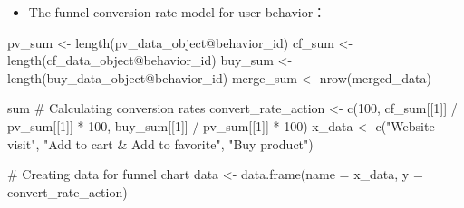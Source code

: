 \documentclass[
  11pt,
]{article}
\newenvironment{Shaded}{\begin{snugshade}}{\end{snugshade}}
\newcommand{\AttributeTok}[1]{\textcolor[rgb]{0.40,0.45,0.13}{#1}}
\newcommand{\CommentTok}[1]{\textcolor[rgb]{0.37,0.37,0.37}{#1}}
\newcommand{\DecValTok}[1]{\textcolor[rgb]{0.68,0.00,0.00}{#1}}
\newcommand{\FunctionTok}[1]{\textcolor[rgb]{0.28,0.35,0.67}{#1}}
\newcommand{\NormalTok}[1]{\textcolor[rgb]{0.00,0.23,0.31}{#1}}
\newcommand{\OtherTok}[1]{\textcolor[rgb]{0.00,0.23,0.31}{#1}}
\newcommand{\SpecialCharTok}[1]{\textcolor[rgb]{0.37,0.37,0.37}{#1}}
\newcommand{\StringTok}[1]{\textcolor[rgb]{0.13,0.47,0.30}{#1}}
\providecommand{\tightlist}{%
  \setlength{\itemsep}{0pt}\setlength{\parskip}{0pt}}\usepackage{longtable,booktabs,array}
\begin{document}
\begin{itemize}
\tightlist
\item
  The funnel conversion rate model for user behavior：
\end{itemize}

\begin{Shaded}
\begin{Highlighting}[]
\NormalTok{pv\_sum  }\OtherTok{\textless{}{-}} \FunctionTok{length}\NormalTok{(pv\_data\_object}\SpecialCharTok{@}\NormalTok{behavior\_id)}
\NormalTok{cf\_sum  }\OtherTok{\textless{}{-}} \FunctionTok{length}\NormalTok{(cf\_data\_object}\SpecialCharTok{@}\NormalTok{behavior\_id)}
\NormalTok{buy\_sum  }\OtherTok{\textless{}{-}} \FunctionTok{length}\NormalTok{(buy\_data\_object}\SpecialCharTok{@}\NormalTok{behavior\_id)}
\NormalTok{merge\_sum }\OtherTok{\textless{}{-}} \FunctionTok{nrow}\NormalTok{(merged\_data)}

\NormalTok{sum}
\CommentTok{\# Calculating conversion rates}
\NormalTok{convert\_rate\_action }\OtherTok{\textless{}{-}} \FunctionTok{c}\NormalTok{(}\DecValTok{100}\NormalTok{, cf\_sum[[}\DecValTok{1}\NormalTok{]] }\SpecialCharTok{/}\NormalTok{ pv\_sum[[}\DecValTok{1}\NormalTok{]] }\SpecialCharTok{*} \DecValTok{100}\NormalTok{,}
\NormalTok{                         buy\_sum[[}\DecValTok{1}\NormalTok{]] }\SpecialCharTok{/}\NormalTok{ pv\_sum[[}\DecValTok{1}\NormalTok{]] }\SpecialCharTok{*} \DecValTok{100}\NormalTok{)}
\NormalTok{x\_data }\OtherTok{\textless{}{-}} \FunctionTok{c}\NormalTok{(}\StringTok{"Website visit"}\NormalTok{,}
            \StringTok{"Add to cart \& Add to favorite"}\NormalTok{, }\StringTok{"Buy product"}\NormalTok{)}

\CommentTok{\# Creating data for funnel chart}
\NormalTok{data }\OtherTok{\textless{}{-}} \FunctionTok{data.frame}\NormalTok{(}\AttributeTok{name =}\NormalTok{ x\_data, }\AttributeTok{y =}\NormalTok{ convert\_rate\_action)}


\end{Highlighting}
\end{Shaded}
\end{document}
